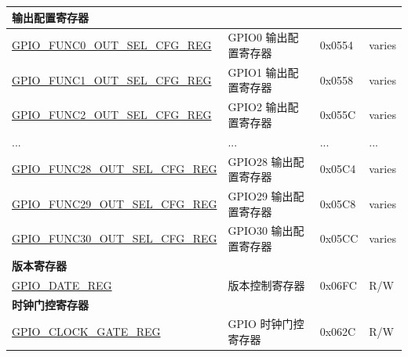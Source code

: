 \begin{longtable}{ | p{5.8cm} | p{7.2cm} | p{1.3cm} | p{2cm} | }
\multicolumn{4}{|l|}{\textbf{输出配置寄存器}} \\ \hline
\hyperref[regdesc:GPIOFUNCNOUTSELCFGREG]{GPIO\_FUNC0\_OUT\_SEL\_CFG\_REG} & GPIO0 输出配置寄存器 & 0x0554 & varies \\ \hline
\hyperref[regdesc:GPIOFUNCNOUTSELCFGREG]{GPIO\_FUNC1\_OUT\_SEL\_CFG\_REG} & GPIO1 输出配置寄存器 & 0x0558 & varies \\ \hline
\hyperref[regdesc:GPIOFUNCNOUTSELCFGREG]{GPIO\_FUNC2\_OUT\_SEL\_CFG\_REG} & GPIO2 输出配置寄存器 & 0x055C & varies \\ \hline
...& ... & ... & ... \\ \hline
\hyperref[regdesc:GPIOFUNCNOUTSELCFGREG]{GPIO\_FUNC28\_OUT\_SEL\_CFG\_REG} & GPIO28 输出配置寄存器 & 0x05C4 & varies \\ \hline
\hyperref[regdesc:GPIOFUNCNOUTSELCFGREG]{GPIO\_FUNC29\_OUT\_SEL\_CFG\_REG} & GPIO29 输出配置寄存器 & 0x05C8 & varies \\ \hline
\hyperref[regdesc:GPIOFUNCNOUTSELCFGREG]{GPIO\_FUNC30\_OUT\_SEL\_CFG\_REG} & GPIO30 输出配置寄存器 & 0x05CC & varies \\ \hline

\multicolumn{4}{|l|}{\textbf{版本寄存器}} \\ \hline
\hyperref[regdesc:GPIOREGDATEREG]{GPIO\_DATE\_REG} & 版本控制寄存器 & 0x06FC & R/W \\ \hline

\multicolumn{4}{|l|}{\textbf{时钟门控寄存器}} \\ \hline
\hyperref[regdesc:GPIOCLOCKGATEREG]{GPIO\_CLOCK\_GATE\_REG} & GPIO 时钟门控寄存器 & 0x062C & R/W \\ \hline
\end{longtable}
